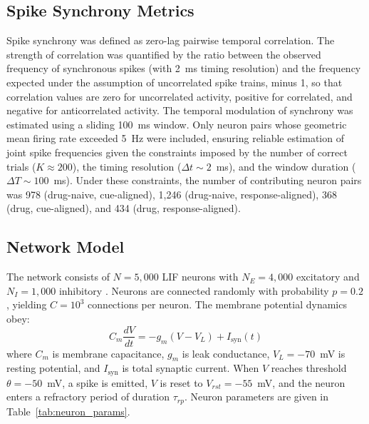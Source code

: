 \documentclass[10pt]{article}
\begin{document}
\subsection{Spike Synchrony Metrics}

Spike synchrony was defined as zero-lag pairwise temporal correlation. The strength of correlation was quantified by the ratio between the observed frequency of synchronous spikes (with 2~ms timing resolution) and the frequency expected under the assumption of uncorrelated spike trains, minus 1, so that correlation values are zero for uncorrelated activity, positive for correlated, and negative for anticorrelated activity. The temporal modulation of synchrony was estimated using a sliding 100~ms window. Only neuron pairs whose geometric mean firing rate exceeded 5~Hz were included, ensuring reliable estimation of joint spike frequencies given the constraints imposed by the number of correct trials ($K \approx 200$), the timing resolution ($\Delta t \sim 2$~ms), and the window duration ($\Delta T \sim 100$~ms). Under these constraints, the number of contributing neuron pairs was 978 (drug-naive, cue-aligned), 1,246 (drug-naive, response-aligned), 368 (drug, cue-aligned), and 434 (drug, response-aligned).

\subsection{Network Model}

The network consists of $N = 5{,}000$ LIF neurons with $N_E = 4{,}000$ excitatory and $N_I = 1{,}000$ inhibitory \citep{abeles1991corticonics}. Neurons are connected randomly with probability $p = 0.2$, yielding $C = 10^3$ connections per neuron. The membrane potential dynamics obey:
\begin{equation}
C_m \frac{dV}{dt} = -g_m(V - V_L) + I_{\mathrm{syn}}(t)
\label{eq:lif}
\end{equation}
where $C_m$ is membrane capacitance, $g_m$ is leak conductance, $V_L = -70$~mV is resting potential, and $I_{\mathrm{syn}}$ is total synaptic current. When $V$ reaches threshold $\theta = -50$~mV, a spike is emitted, $V$ is reset to $V_{rst} = -55$~mV, and the neuron enters a refractory period of duration $\tau_{rp}$. Neuron parameters are given in Table~\ref{tab:neuron_params}.
\end{document}
